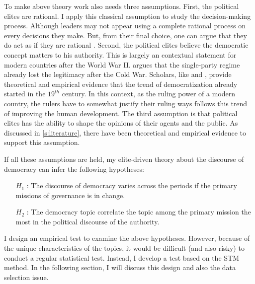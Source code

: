 \documentclass[abstracton,UTF8]{ctexart}
\makeatletter
\def\namedlabel#1#2{\begingroup
	#2%
	\def\@currentlabel{#2}%
	\phantomsection\label{#1}\endgroup
}
\makeatother
\begin{document}
To make above theory work also needs three assumptions. First, the political elites are rational. I apply this classical assumption to study the decision-making process. Although leaders may not appear using a complete rational process on every decisions they make. But, from their final choice, one can argue that they do act as if they are rational \citep{BuenodeM2003}. Second, the political elites believe the democratic concept matters to his authority. This is largely an contextual statement for modern countries after the World War II. \citet{Schedler2013} argues that the single-party regime already lost the legitimacy after the Cold War. Scholars, like \citet{Fukuyama2006} and \citet{Huntington1993}, provide theoretical and empirical evidence that the trend of democratization already started in the $19^{th}$ century. In this context, as the ruling power of a modern country, the rulers have to somewhat justify their ruling ways follows this trend of improving the human development. The third assumption is that political elites has the ability to shape the opinions of their agents and the public. As discussed in \cref{s:literature}, there have been theoretical and empirical evidence to support this assumption.

If all these assumptions are held, my elite-driven theory about the discourse of democracy can infer the following hypotheses:
\begin{itemize}
	\item[\namedlabel{h:dynamic}{$H_1$}]: The discourse of democracy varies across the periods if the primary missions of governance is in change. 
	\item[\namedlabel{h:response}{$H_2$}]: The democracy topic correlate the topic among the primary mission the most in the political discourse of the authority.
\end{itemize}


I design an empirical test to examine the above hypotheses. However, because of the unique characteristics of the topics, it would be difficult (and also risky) to conduct a regular statistical test. Instead, I develop a test based on the STM method. In the following section, I will discuss this design and also the data selection issue.
\end{document}
